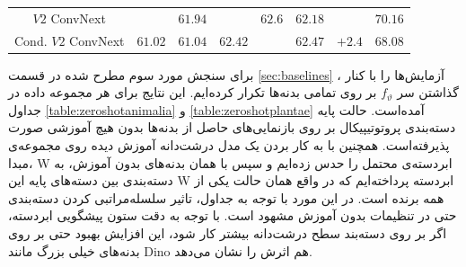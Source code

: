 \begin{table}[!htbp]
{\begin{tabular}{c|ccccccc}
			$V2$ ConvNext             &                                                                             & \textit{$61.94$}          & \textit{\pmb{$63.2$}} & \textit{$62.6$}           & \textit{$62.18$}          & {\color[HTML]{009901} }                                                   & $70.16$                                                                          \\
			Cond. $V2$ ConvNext       & \multirow{-2}{*}{$61.02$}                                                     & \textit{$61.04$}          & \textit{$62.42$}         & \textit{\pmb{$62.47$}} & \textit{$62.47$}          & \multirow{-2}{*}{{\color[HTML]{009901} $+2.4$}}                             & $68.08$                                                                          \\ \hline
		\end{tabular}%
	}
\end{table}

برای سنجش مورد سوم مطرح شده در قسمت
\ref{sec:baselines}
، آزمایش‌ها را با کنار گذاشتن سر 
$f_\vartheta$
بر روی تمامی بدنه‌ها تکرار کرده‌ایم. این نتایج برای هر مجموعه داده در جداول 
\ref{table:zeroshotanimalia}
و 
\ref{table:zeroshotplantae}
آمده‌است. حالت پایه دسته‌بندی پروتوتیپیکال بر روی بازنمایی‌های حاصل از بدنه‌ها بدون هیچ آموزشی صورت پذیرفته‌است. همچنین با به کار بردن یک مدل درشت‌دانه آموزش دیده روی مجموعه‌ی مبدا، W ابردسته‌ی محتمل را حدس زده‌ایم و سپس با همان بدنه‌های بدون آموزش، به دسته‌بندی بین دسته‌های پایه این W ابردسته پرداخته‌ایم که در واقع همان حالت یکی از همه برنده است. در این مورد با توجه به جداول، تاثیر سلسله‌مراتبی کردن دسته‌بندی حتی در تنظیمات بدون آموزش مشهود است. با توجه به دقت ستون پیشگویی ابردسته، اگر بر روی دسته‌بند سطح درشت‌دانه بیشتر کار شود، این افزایش بهبود حتی بر روی بدنه‌های خیلی بزرگ مانند Dino هم اثرش را نشان می‌دهد.


